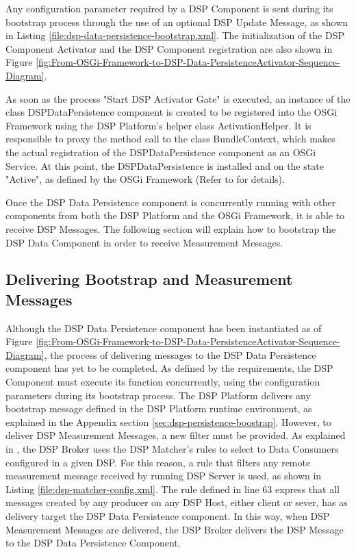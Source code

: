 Any configuration parameter required by a DSP Component is sent during its
bootstrap process through the use of an optional DSP Update Message, as shown
in Listing \ref{file:dsp-data-persistence-bootstrap.xml}. The initialization of
the DSP Component Activator and the DSP Component registration are also shown
in Figure \ref{fig:From-OSGi-Framework-to-DSP-Data-PersistenceActivator-Sequence-Diagram}.

As soon as the process "Start DSP Activator Gate" is executed, an instance of
the class DSPDataPersistence component is created to be registered into the
OSGi Framework using the DSP Platform's helper class ActivationHelper. It is
responsible to proxy the method call to the class BundleContext, which makes
the actual registration of the DSPDataPersistence component as an OSGi
Service. At this point, the DSPDataPersistence is installed and on the state
"Active", as defined by the OSGi Framework (Refer to
\cite{netbeams-dsp-architecture} for details).

Once the DSP Data Persistence component is concurrently running with other
components from both the DSP Platform and the OSGi Framework, it is able to
receive DSP Messages. The following section will explain how to bootstrap the
DSP Data Component in order to receive Measurement Messages.

\subsection{Delivering Bootstrap and Measurement Messages}

Although the DSP Data Persistence component has been instantiated as of Figure
\ref{fig:From-OSGi-Framework-to-DSP-Data-PersistenceActivator-Sequence-Diagram}, 
the process of delivering messages to the DSP Data Persistence component has yet
to be completed. As defined by the requirements, the DSP Component must execute its
function concurrently, using the configuration parameters during its
bootstrap process. The DSP Platform delivers any bootstrap message defined in
the DSP Platform runtime environment, as explained in the Appendix section
\ref{sec:dsp-persistence-boostrap}. However, to deliver DSP Measurement
Messages, a new filter must be provided. As explained in
\cite{netbeams-dsp-architecture}, the DSP Broker uses the DSP Matcher's rules
to select to Data Consumers configured in a given DSP. For this reason, a rule
that filters any remote measurement message received by running DSP Server is
used, as shown in Listing \ref{file:dsp-matcher-config.xml}. The rule defined
in line 63 express that all messages created by any producer on any DSP Host,
either client or sever, has as delivery target the DSP Data Persistence
component. In this way, when DSP Measurement Messages are delivered, the DSP
Broker delivers the DSP Message to the DSP Data Persistence Component.

